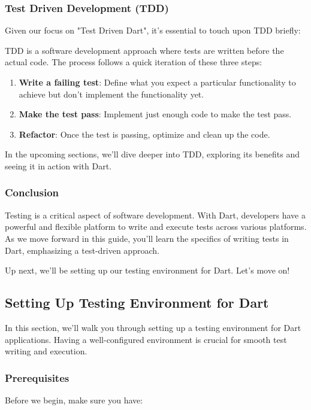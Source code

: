 \subsubsection*{Test Driven Development (TDD)}

Given our focus on "Test Driven Dart", it's essential to touch upon TDD briefly:

\noindent TDD is a software development approach where tests are written before the actual code. The process follows a quick iteration of these three steps:
\begin{enumerate}
    \item \textbf{Write a failing test}: Define what you expect a particular functionality to achieve but don't implement the functionality yet.
    \item \textbf{Make the test pass}: Implement just enough code to make the test pass.
    \item \textbf{Refactor}: Once the test is passing, optimize and clean up the code.
\end{enumerate}
In the upcoming sections, we'll dive deeper into TDD, exploring its benefits and seeing it in action with Dart.

\subsubsection*{Conclusion}
Testing is a critical aspect of software development. With Dart, developers have a powerful and flexible platform to write and execute tests across various platforms. As we move forward in this guide, you'll learn the specifics of writing tests in Dart, emphasizing a test-driven approach.

Up next, we'll be setting up our testing environment for Dart. Let's move on!

\subsection{Setting Up Testing Environment for Dart}\label{setting-up-testing-environment-for-dart}

In this section, we'll walk you through setting up a testing environment for Dart applications. Having a well-configured environment is crucial for smooth test writing and execution.

\subsubsection*{Prerequisites}
Before we begin, make sure you have:

